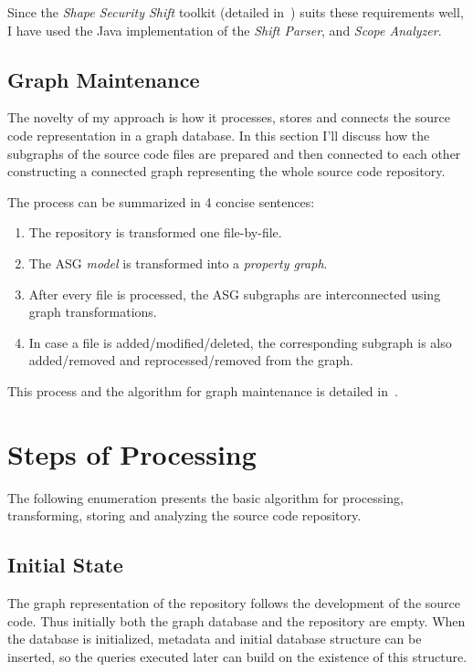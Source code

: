 Since the \emph{Shape Security Shift} toolkit (detailed in~) suits these requirements well, I have used the Java implementation of the \emph{Shift Parser}, and \emph{Scope Analyzer}.


\subsection{Graph Maintenance}
The novelty of my approach is how it processes, stores and connects the source code representation in a graph database. In this section I'll discuss how the subgraphs of the source code files are prepared and then connected to each other constructing a connected graph representing the whole source code repository.

The process can be summarized in 4 concise sentences:
\begin{enumerate}[topsep=0pt]
  \item The repository is transformed one file-by-file.
  \item The ASG \emph{model} is transformed into a \emph{property graph}.
  \item After every file is processed, the ASG subgraphs are interconnected using graph transformations.
  \item In case a file is added/modified/deleted, the corresponding subgraph is also added/removed and reprocessed/removed from the graph.
\end{enumerate}

This process and the algorithm for graph maintenance is detailed in~.


\section{Steps of Processing}
The following enumeration presents the basic algorithm for processing, transforming, storing and analyzing the source code repository.

\subsection{Initial State}
The graph representation of the repository follows the development of the source code. Thus initially both the graph database and the repository are empty. When the database is initialized, metadata and initial database structure can be inserted, so the queries executed later can build on the existence of this structure.

